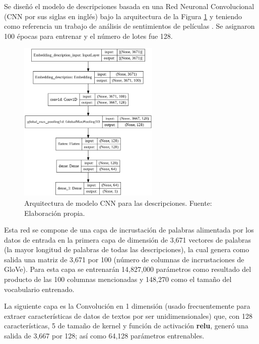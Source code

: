 Se diseñó el modelo de descripciones basada en una Red Neuronal Convolucional (CNN por sus siglas en inglés) bajo la arquitectura de la Figura \ref{4:fig39} y teniendo como referencia un trabajo de análisis de sentimientos de películas \parencite{tec_malik2019pythonnlp}. Se asignaron 100 épocas para entrenar y el número de lotes fue 128.

\begin{figure}[!ht]
	\begin{center}
		\includegraphics[width=0.60\textwidth]{4/figures/model_cnn_description.png}
		\caption{Arquitectura de modelo CNN para las descripciones. Fuente: Elaboración propia.}
		\label{4:fig39}
	\end{center}
\end{figure}

Esta red se compone de una capa de incrustación de palabras alimentada por los datos de entrada en la primera capa de dimensión de 3,671 vectores de palabras (la mayor longitud de palabras de todas las descripciones), la cual genera como salida una matriz de 3,671 por 100 (número de columnas de incrustaciones de GloVe). Para esta capa se entrenarán 14,827,000 parámetros como resultado del producto de las 100 columnas mencionadas y 148,270 como el tamaño del vocabulario entrenado.

La siguiente capa es la Convolución en 1 dimensión (usado frecuentemente para extraer características de datos de textos por ser unidimensionales) que, con 128 características, 5 de tamaño de kernel y función de activación \textbf{relu}, generó una salida de 3,667 por 128; así como 64,128 parámetros entrenables.

